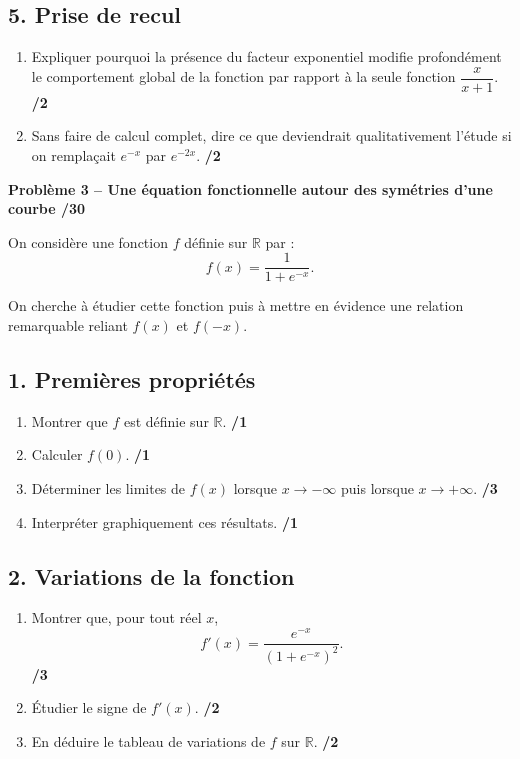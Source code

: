 \documentclass[11pt,a4paper]{article}
\begin{document}
\subsection*{5. Prise de recul}
\begin{enumerate}
    \item Expliquer pourquoi la présence du facteur exponentiel modifie profondément le comportement global de la fonction par rapport à la seule fonction \(\dfrac{x}{x+1}\). \hfill \textbf{/2}
    \item Sans faire de calcul complet, dire ce que deviendrait qualitativement l'étude si on remplaçait \(e^{-x}\) par \(e^{-2x}\). \hfill \textbf{/2}
\end{enumerate}

\vspace{1em}

\textbf{Problème 3 -- Une équation fonctionnelle autour des symétries d'une courbe \hfill /30}

On considère une fonction \(f\) définie sur \(\mathbb{R}\) par :
\[
f(x)=\frac{1}{1+e^{-x}}.
\]

On cherche à étudier cette fonction puis à mettre en évidence une relation remarquable reliant \(f(x)\) et \(f(-x)\).

\subsection*{1. Premières propriétés}
\begin{enumerate}
    \item Montrer que \(f\) est définie sur \(\mathbb{R}\). \hfill \textbf{/1}
    \item Calculer \(f(0)\). \hfill \textbf{/1}
    \item Déterminer les limites de \(f(x)\) lorsque \(x\to -\infty\) puis lorsque \(x\to +\infty\). \hfill \textbf{/3}
    \item Interpréter graphiquement ces résultats. \hfill \textbf{/1}
\end{enumerate}

\subsection*{2. Variations de la fonction}
\begin{enumerate}
    \item Montrer que, pour tout réel \(x\),
    \[
    f'(x)=\frac{e^{-x}}{(1+e^{-x})^2}.
    \]
    \hfill \textbf{/3}
    \item Étudier le signe de \(f'(x)\). \hfill \textbf{/2}
    \item En déduire le tableau de variations de \(f\) sur \(\mathbb{R}\). \hfill \textbf{/2}
\end{enumerate}
\end{document}
